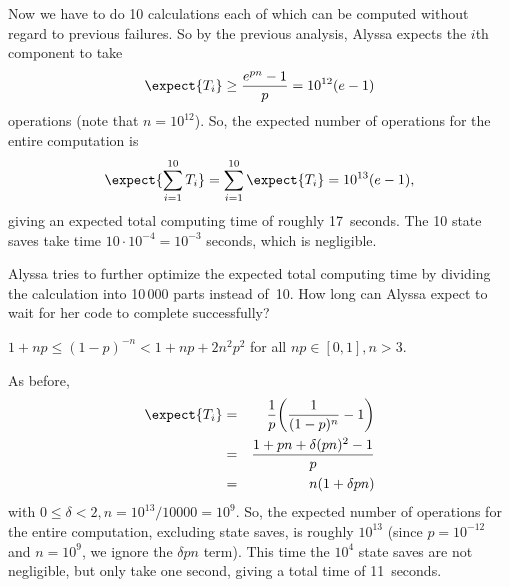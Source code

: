 \begin{problem}
\begin{problemparts}
\begin{solution}
Now we have to do 10 calculations each of which can be
computed without regard to previous failures.  So by the previous
analysis, Alyssa expects the $i$th component to take
\[
    \expect{T_i} \geq \frac{e^{pn}-1}{p} = 10^{12} (e - 1)
\]
operations (note that $n = 10^{12}$). So, the expected number of
operations for the entire computation is
\[
\expect{\sum_{i=1}^{10} T_i} = 
\sum_{i=1}^{10} \expect{T_i} = 10^{13} (e - 1),
\]
giving an expected total computing time of roughly 17~seconds.  The 10
state saves take time $10 \cdot 10^{-4} = 10^{-3}$ seconds, which is
negligible.
\end{solution}

\problempart Alyssa tries to further optimize the expected total computing
time by dividing the calculation into 10\,000 parts instead of~10.
How long can Alyssa expect to wait for her code to complete
successfully? 

\hint $1+np\leq (1-p)^{-n}<1 + np + 2n^2p^2$ for all $np \in
[0,1], n>3$.

\begin{solution}
As before,
\begin{eqnarray*} 
  \expect{T_i} &=& \frac{1}{p}\biggl(\frac{1}{(1-p)^n} - 1\biggr)\\
  &=& \frac{1 + pn + \delta(pn)^2 - 1}{p}\\
  &=& n(1 + \delta pn) 
\end{eqnarray*} 
with $0\leq\delta<2, n = 10^{13} / 10000 = 10^9$. So, the expected
number of operations for the entire computation, excluding state saves,
is roughly $10^{13}$ (since $p = 10^{-12}$ and $n = 10^9$, we ignore the
$\delta pn$ term).  This time the $10^{4}$ state saves are not
negligible, but only take one second, giving a total time of
11~seconds.
\end{solution}

\end{problemparts}
\end{problem}

\endinput
